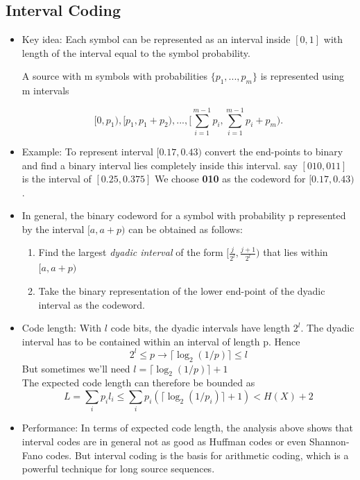 \documentclass[24pt]{article}
\begin{document}
\subsection{Interval Coding}
\begin{itemize}
\item Key idea: Each symbol can be represented as an interval inside $[0,1]$ with length of the interval equal to the symbol probability. 

A source with m symbols with probabilities $\{ p_1,...,p_m\}$ is represented using m intervals 

\[
[0,p_1), [p_1, p_1+p_2),...,[\sum_{i=1}^{m-1}p_i, \sum_{i=1}^{m-1}p_i + p_m).
\]
\item Example: To represent interval $[0.17,0.43)$ convert the end-points to binary and find a binary interval lies completely inside this interval. say $[010,011]$ is the interval of $[0.25,0.375]$ We choose \textbf{010} as the codeword for $[0.17,0.43)$.

\item In general, the binary codeword for a symbol with probability p represented by the interval $[a,a+p)$ can be obtained as follows:
\begin{enumerate}
\item Find the largest \textit{dyadic interval} of the form $[\frac{j}{2^{\mathit{l}}}, \frac{j+1}{2^{\mathit{l}}})$ that lies within $[a,a+p)$
\item Take the binary representation of the lower end-point of the dyadic interval as the codeword.
\end{enumerate}
\item Code length: With $\mathit{l}$ code bits, the dyadic intervals have length $2^\mathit{l}$. The dyadic interval has to be contained within an interval of length p. Hence 
\[
2^\mathit{l} \le p \rightarrow \lceil \log_2(1/p) \rceil \le \mathit{l}
\]
But sometimes we'll need $\mathit{l} =\lceil \log_2(1/p) \rceil +1 $ \\
The expected code length can therefore be bounded as 
\[
L = \sum_i p_i\mathit{l}_i \le \sum_i p_i (\lceil \log_2(1/p_i) \rceil +1) < H(X) + 2
\]
\item Performance: In terms of expected code length, the analysis above shows that interval codes are in general not as good as Huffman codes or even Shannon-Fano codes. But interval coding is the basis for arithmetic coding, which is a powerful technique for long source sequences.

\end{itemize}
\end{document}
